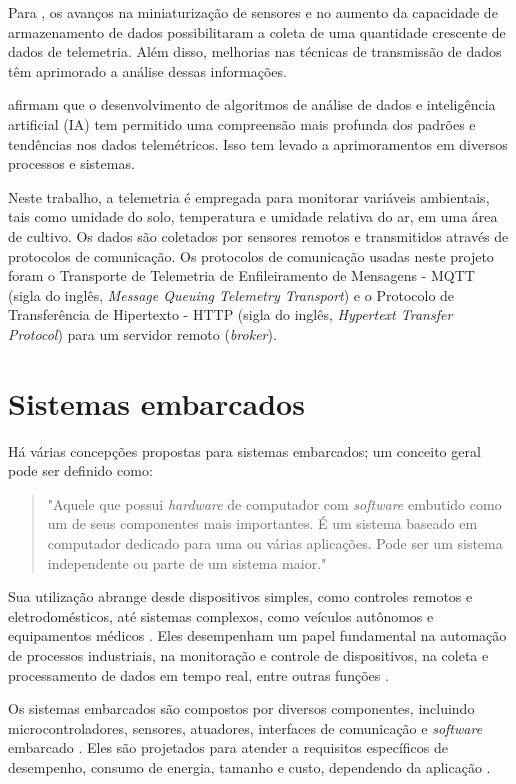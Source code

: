 Para \textcite{Lizhuang_telemetry2021}, os avanços na miniaturização de sensores e no aumento da capacidade de armazenamento de dados possibilitaram a coleta de uma quantidade crescente de dados de telemetria. Além disso, melhorias nas técnicas de transmissão de dados têm aprimorado a análise dessas informações. 

\textcite{Ding_telemetry2017} afirmam que o desenvolvimento de algoritmos de análise de dados e inteligência artificial (IA) tem permitido uma compreensão mais profunda dos padrões e tendências nos dados telemétricos. Isso tem levado a aprimoramentos em diversos processos e sistemas.

Neste trabalho, a telemetria é empregada para monitorar variáveis ambientais, tais como umidade do solo, temperatura e umidade relativa do ar, em uma área de cultivo.  Os dados são coletados por sensores remotos e transmitidos através de protocolos de comunicação. Os protocolos de comunicação usadas neste projeto foram o Transporte de Telemetria de Enfileiramento de Mensagens - MQTT (sigla do inglês, \textit{Message Queuing Telemetry Transport}) e o Protocolo de Transferência de Hipertexto - HTTP (sigla do inglês, \textit{Hypertext Transfer Protocol}) para um servidor remoto (\textit{broker}).

\section{Sistemas embarcados}
Há várias concepções propostas para sistemas embarcados; um conceito geral pode ser definido como:

\begin{quote}
"Aquele que possui \textit{hardware} de computador com \textit{software} embutido como um de seus componentes mais importantes. É um sistema baseado em computador dedicado para uma ou várias aplicações. Pode ser um sistema independente ou parte de um sistema maior." \parencite[{p. 39}]{dutta2014comprehensive}
\end{quote}

Sua utilização abrange desde dispositivos simples, como controles remotos e eletrodomésticos, até sistemas complexos, como veículos autônomos e equipamentos médicos \parencite{lee2008cyber, kato2018autoware}. Eles desempenham um papel fundamental na automação de processos industriais, na monitoração e controle de dispositivos, na coleta e processamento de dados em tempo real, entre outras funções \parencite{dutta2014comprehensive}.

Os sistemas embarcados são compostos por diversos componentes, incluindo microcontroladores, sensores, atuadores, interfaces de comunicação e \textit{software} embarcado \parencite{lee2008cyber}.
Eles são projetados para atender a requisitos específicos de desempenho, consumo de energia, tamanho e custo, dependendo da aplicação \parencite{Mazid_microcontrolador2011}.

